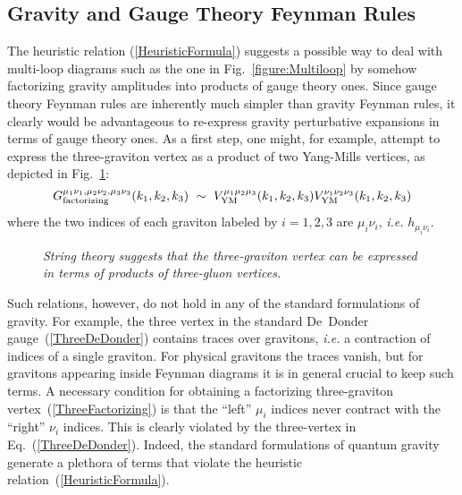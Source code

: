 \documentclass[12pt]{livrev}
\begin{document}
\subsection{Gravity and Gauge Theory Feynman Rules}

The heuristic relation (\ref{HeuristicFormula}) suggests a possible
way to deal with multi-loop diagrams such as the one in
Fig.~\ref{figure:Multiloop} by somehow factorizing gravity amplitudes
into products of gauge theory ones.  Since gauge theory Feynman rules
are inherently much simpler than gravity Feynman rules, it clearly
would be advantageous to re-express gravity perturbative expansions in
terms of gauge theory ones.  As a first step, one might, for example,
attempt to express the three-graviton vertex as a product of two
Yang-Mills vertices, as depicted in Fig.~\ref{figure:ThreeVertex}:
%
\begin{equation}
G_{\rm factorizing}^{\mu_1 \nu_1,\mu_2\nu_2,\mu_3\nu_3}(k_1,k_2,k_3)\ \sim\
V_{\rm YM}^{\mu_1 \mu_2 \mu_3}(k_1,k_2,k_3)
V_{\rm YM}^{\nu_1 \nu_2 \nu_3}(k_1,k_2,k_3)
\label{ThreeFactorizing}
\end{equation}
%
where the two indices of each graviton labeled by $i=1,2,3$ are 
$\mu_i \nu_i$, {\it i.e.} $h_{\mu_i \nu_i}$. 


\begin{figure}[h]
  \def\epsfsize#1#2{0.4#1}
  \centerline{}
  \caption{\it String theory suggests that the three-graviton vertex can
be expressed in terms of products of three-gluon vertices.}
  \label{figure:ThreeVertex}
\end{figure}

Such relations, however, do not hold in any of the standard formulations
of gravity.  For example, the three vertex in the standard De~Donder
gauge~(\ref{ThreeDeDonder}) contains traces over gravitons, {\it i.e.} a
contraction of indices of a single graviton.  For physical gravitons
the traces vanish, but for gravitons appearing inside Feynman diagrams
it is in general crucial to keep such terms.  A necessary condition
for obtaining a factorizing three-graviton
vertex~(\ref{ThreeFactorizing}) is that the ``left'' $\mu_i$ indices
never contract with the ``right'' $\nu_i$ indices.  This is clearly
violated by the three-vertex in Eq.~(\ref{ThreeDeDonder}).  Indeed,
the standard formulations of quantum gravity generate a plethora of
terms that violate the heuristic relation~(\ref{HeuristicFormula}).
\end{document}
